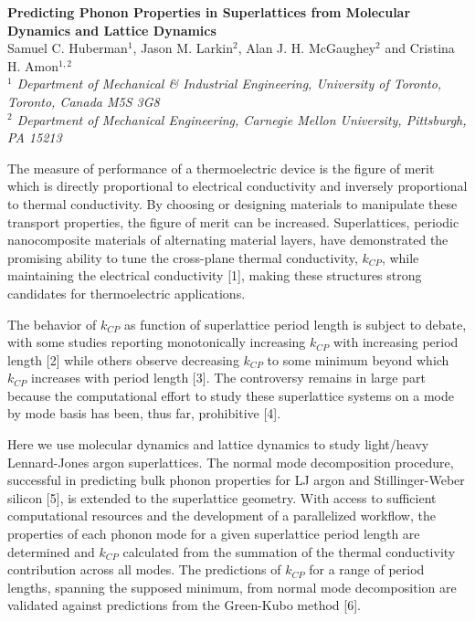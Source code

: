 \documentclass[12pt,twoside]{article}
\begin{document}
\begin{center}
\textbf{Predicting Phonon Properties in Superlattices from Molecular Dynamics and Lattice Dynamics}\\
\footnotesize
Samuel C. Huberman$^1$, Jason M. Larkin$^2$, Alan J. H. McGaughey$^2$ and Cristina H. Amon$^{1,2}$\\
\textit{$^1$ Department of Mechanical \& Industrial Engineering, University of Toronto, Toronto, Canada M5S 3G8}\\
\textit{$^2$ Department of Mechanical Engineering, Carnegie Mellon University, Pittsburgh, PA 15213}
\end{center}
\begin{spacing}{1.25}
The measure of performance of a thermoelectric device is the figure of merit which is directly proportional to electrical conductivity and inversely proportional to thermal conductivity. By choosing or designing materials to manipulate these transport properties, the figure of merit can be increased. Superlattices, periodic nanocomposite materials of alternating material layers, have demonstrated the promising ability to tune the cross-plane thermal conductivity, $k_{CP}$, while maintaining the electrical conductivity [1], making these structures strong candidates for thermoelectric applications.

The behavior of $k_{CP}$ as function of superlattice period length is subject to debate, with some studies reporting monotonically increasing $k_{CP}$ with increasing period length [2] while others observe decreasing $k_{CP}$  to some minimum beyond which $k_{CP}$  increases with period length [3]. The controversy remains in large part because the computational effort to study these superlattice systems on a mode by mode basis has been, thus far, prohibitive [4].

Here we use molecular dynamics and lattice dynamics to study light/heavy Lennard-Jones argon superlattices. The normal mode decomposition procedure, successful in predicting bulk phonon properties for LJ argon and Stillinger-Weber silicon [5], is extended to the superlattice geometry. With access to sufficient computational resources and the development of a parallelized workflow, the properties of each phonon mode for a given superlattice period length are determined and $k_{CP}$ calculated from the summation of the thermal conductivity contribution across all modes. The predictions of $k_{CP}$ for a range of period lengths, spanning the supposed minimum, from normal mode decomposition are validated against predictions from the Green-Kubo method [6].


\end{spacing}
\end{document}
